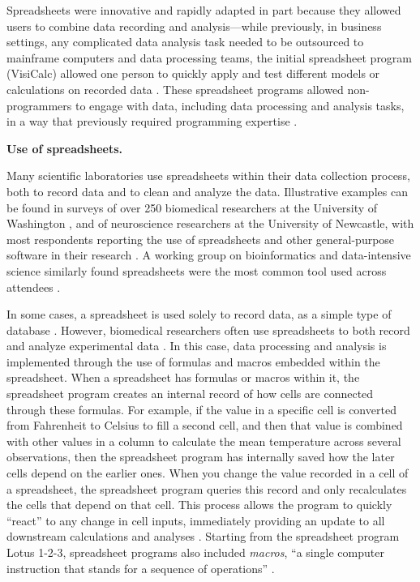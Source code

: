 \documentclass[]{tufte-book}
\begin{document}
Spreadsheets were innovative and rapidly adapted in part because they allowed
users to combine data recording and analysis---while previously, in business
settings, any complicated data analysis task needed to be outsourced to
mainframe computers and data processing teams, the initial spreadsheet program
(VisiCalc) allowed one person to quickly apply and test different models or
calculations on recorded data \citep{levy1984spreadsheet}. These spreadsheet programs
allowed non-programmers to engage with data, including data processing and
analysis tasks, in a way that previously required programming expertise
\citep{levy1984spreadsheet}.

\textbf{Use of spreadsheets.}

Many scientific laboratories use spreadsheets within their data collection
process, both to record data and to clean and analyze the data. Illustrative
examples can be found in surveys of over 250 biomedical researchers at the University
of Washington \citep{anderson2007issues}, and of neuroscience researchers at the
University of Newcastle, with most respondents reporting the use of spreadsheets
and other general-purpose software in their research \citep{altarawneh2017pilot}.
A working group on bioinformatics and data-intensive science similarly found
spreadsheets were the most common tool used across attendees
\citep{barga2011bioinformatics}.

In some cases, a spreadsheet is used solely to record data, as a simple type of
database \citep{birch2018future}. However, biomedical researchers often use
spreadsheets to both record and analyze experimental data \citep{anderson2007issues}.
In this case, data processing and analysis is implemented through the use of
formulas and macros embedded within the spreadsheet. When a spreadsheet has
formulas or macros within it, the spreadsheet program creates an internal record
of how cells are connected through these formulas. For example, if the value in
a specific cell is converted from Fahrenheit to Celsius to fill a second cell,
and then that value is combined with other values in a column to calculate the
mean temperature across several observations, then the spreadsheet program has
internally saved how the later cells depend on the earlier ones. When you change
the value recorded in a cell of a spreadsheet, the spreadsheet program queries
this record and only recalculates the cells that depend on that cell. This
process allows the program to quickly ``react'' to any change in cell inputs,
immediately providing an update to all downstream calculations and analyses
\citep{levy1984spreadsheet}. Starting from the spreadsheet program Lotus 1-2-3,
spreadsheet programs also included \emph{macros}, ``a single computer instruction that
stands for a sequence of operations'' \citep{creeth1985microcomputer}.
\end{document}
